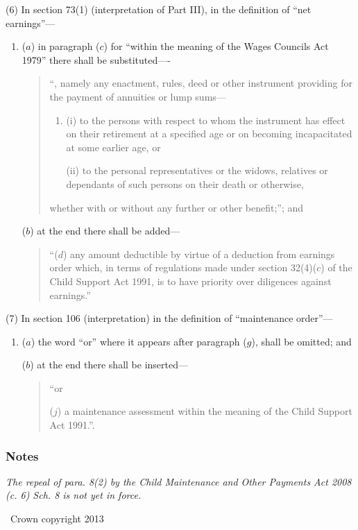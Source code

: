 \documentclass[a4paper]{article}
\newcommand\amendment[1]{\subsubsection*{Notes}{\itshape\frenchspacing\footnotesize #1 \par}}
\begin{document}
(6) In section 73(1) (interpretation of Part III), in the definition of “net earnings”---
\begin{enumerate}\item[]
($a$) in paragraph ($c$) for “within the meaning of the Wages Councils Act 1979” there shall be substituted----
\begin{quotation}  “, namely any enactment, rules, deed or other instrument providing for the payment of annuities or lump sums---
\begin{enumerate}\item[]
(i) to the persons with respect to whom the instrument has effect on their retirement at a specified age or on becoming incapacitated at some earlier age, or

(ii) to the personal representatives or the widows, relatives or dependants of such persons on their death or otherwise,
\end{enumerate}
whether with or without any further or other benefit;”; and
\end{quotation}

($b$) at the end there shall be added—
\begin{quotation}
“($d$) any amount deductible by virtue of a deduction from earnings order which, in terms of regulations made under section 32(4)($c$) of the Child Support Act 1991, is to have priority over diligences against earnings.”
\end{quotation}
\end{enumerate}

(7) In section 106 (interpretation) in the definition of “maintenance order”—
\begin{enumerate}\item[]
($a$) the word “or” where it appears after paragraph ($g$), shall be omitted; and

($b$) at the end there shall be inserted---
\begin{quotation}  “or

($j$) a maintenance assessment within the meaning of the Child Support Act 1991.”.
\end{quotation}
\end{enumerate}

\amendment{
The repeal of para. 8(2) by the Child Maintenance and Other Payments Act 2008 (c. 6) Sch. 8 is not yet in force.
}


\begin{center}
\textcopyright\ Crown copyright 2013
\end{center}
\end{document}
